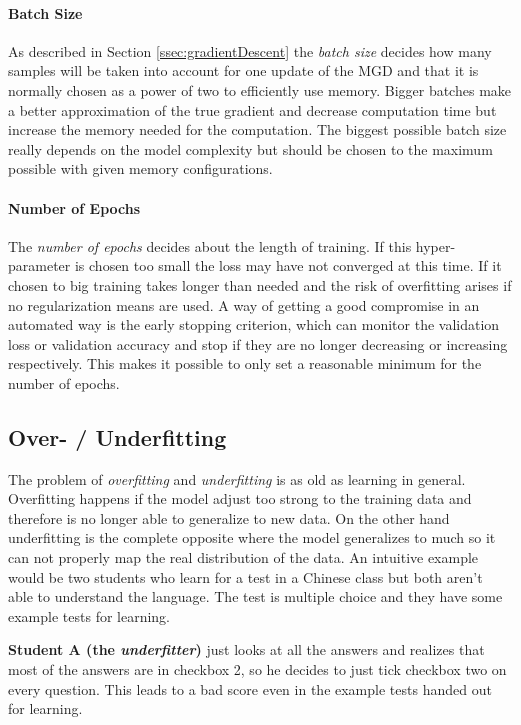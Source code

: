 \paragraph{Batch Size}
As described in Section \ref{ssec:gradientDescent} the \emph{batch size} decides how many samples will be taken into account for one update of the MGD and that it is normally chosen as a power of two to efficiently use memory.
Bigger batches make a better approximation of the true gradient and decrease computation time but increase the memory needed for the computation.
The biggest possible batch size really depends on the model complexity but should be chosen to the maximum possible with given memory configurations.
\paragraph{Number of Epochs}
The \emph{number of epochs} decides about the length of training.
If this hyper-parameter is chosen too small the loss may have not converged at this time.
If it chosen to big training takes longer than needed and the risk of overfitting arises if no regularization means are used.
A way of getting a good compromise in an automated way is the early stopping criterion, which can monitor the validation loss or validation accuracy and stop if they are no longer decreasing or increasing respectively. 
This makes it possible to only set a reasonable minimum for the number of epochs.


\subsection{Over- / Underfitting}\label{ssec:overfitting}
The problem of \emph{overfitting} and \emph{underfitting} is as old as learning in general.
Overfitting happens if the model adjust too strong to the training data and therefore is no longer able to generalize to new data.
On the other hand underfitting is the complete opposite where the model generalizes to much so it can not properly map the real distribution of the data.
An intuitive example would be two students who learn for a test in a Chinese class but both aren't able to understand the language.
The test is multiple choice and they have some example tests for learning.

\textbf{Student A (the \emph{underfitter})} just looks at all the answers and realizes that most of the answers are in checkbox 2, so he decides to just tick checkbox two on every question. This leads to a bad score even in the example tests handed out for learning.

